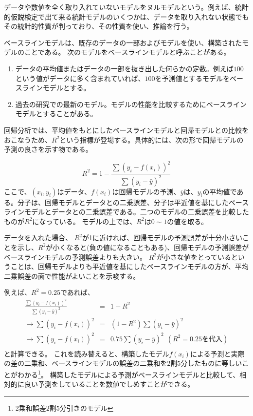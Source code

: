 データや数値を全く取り入れていないモデルをヌルモデルという。例えば、統計的仮説検定で出て来る統計モデルのいくつかは、データを取り入れない状態でもその統計的性質が判っており、その性質を使い、推論を行う。


ベースラインモデルは、既存のデータの一部およびモデルを使い、構築されたモデルのことである。
次のモデルをベースラインモデルと呼ぶことがある。
\begin{enumerate}
 \item データの平均値またはデータの一部を抜き出した何らかの定数。例えば$100$という値がデータに多く含まれていれば、$100$を予測値とするモデルをベースラインモデルとする。
 \item 過去の研究での最新のモデル。モデルの性能を比較するためにベースラインモデルとすることがある。
\end{enumerate}

回帰分析では、平均値をもとにしたベースラインモデルと回帰モデルとの比較をおこなうため、$R^2$という指標が登場する。具体的には、次の形で回帰モデルの予測の良さを示す物である。

\begin{equation}
R^2 = 1- \frac{\sum (y_i-f(x_i))^2}{\sum (y_i-\bar{y})^2}
\end{equation}
ここで、$(x_i,y_i)$はデータ、$f(x_i)$は回帰モデルの予測、$\bar{y}$は、$y_i$の平均値である。分子は、回帰モデルとデータとの二乗誤差、分子は平近値を基にしたベースラインモデルとデータとの二乗誤差である。二つのモデルの二乗誤差を比較したものが$R^2$になっている。
モデルの上では、$R^2$は$0\sim 1$の値を取る。

データを入れた場合、
$R^2$が1に近ければ、回帰モデルの予測誤差が十分小さいことを示し、$R^2$が小くなると(負の値になることもある)、回帰モデルの予測誤差がベースラインモデルの予測誤差よりも大きい。
$R^2$が小さな値をとっているということは、回帰モデルよりも平近値を基にしたベースラインモデルの方が、平均二乗誤差の面で性能がよいことを示唆する。

例えば、$R^2=0.25$であれば、
\begin{eqnarray*}
 \frac{\sum (y_i-f(x_i))^2}{\sum (y_i-\bar{y})^2} &=& 1-R^2 \\
 \rightarrow \sum (y_i-f(x_i))^2 &=& (1-R^2)\sum (y_i-\bar{y})^2 \\
 \rightarrow \sum (y_i-f(x_i))^2 &=& 0.75\sum (y_i-\bar{y})^2 \ \ (R^2 = 0.25を代入) \\
\end{eqnarray*}
と計算できる。
これを読み替えると、構築したモデル$f(x_i)$による予測と実際の差の二乗和、ベースラインモデルの誤差の二乗和を$2$割$5$分したものに等しいことがわかる\footnote{2乗和誤差$2$割$5$分引きのモデル}。
構築したモデルによる予測がベースラインモデルと比較して、相対的に良い予測をしていることを数値でしめすことができる。



